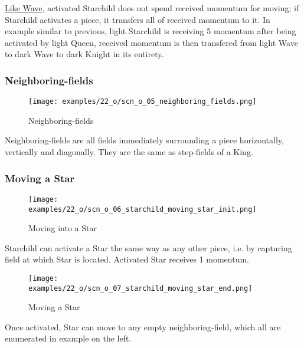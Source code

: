 \hyperref[fig:10_wave]{Like Wave}, activated Starchild does not spend received momentum for moving;
if Starchild activates a piece, it transfers all of received momentum to it. In example similar to
previous, light Starchild is receiving 5 momentum after being activated by light Queen, received
momentum is then transfered from light Wave to dark Wave to dark Knight in its entirety.

\clearpage %

\subsubsection*{Neighboring-fields}

\noindent
\begin{wrapfigure}[5]{l}{0.4\textwidth}
\centering
\texttt{[image: examples/22\_o/scn\_o\_05\_neighboring\_fields.png]}
\caption{Neighboring-fields}
\label{fig:scn_o_05_neighboring_fields}
\end{wrapfigure}
Neighboring-fields are all fields immediately surrounding a piece horizontally, vertically
and diagonally. They are the same as step-fields of a King.


\vspace*{2.1\baselineskip}
\subsubsection*{Moving a Star}

\noindent
\begin{wrapfigure}[5]{l}{0.4\textwidth}
\centering
\texttt{[image: examples/22\_o/scn\_o\_06\_starchild\_moving\_star\_init.png]}
\caption{Moving into a Star}
\label{fig:scn_o_06_starchild_moving_star_init}
\end{wrapfigure}
Starchild can activate a Star the same way as any other piece, i.e. by capturing field at
which Star is located. Activated Star receives 1 momentum.

\vspace*{2.1\baselineskip}
\noindent
\begin{wrapfigure}[7]{l}{0.4\textwidth}
\centering
\texttt{[image: examples/22\_o/scn\_o\_07\_starchild\_moving\_star\_end.png]}
\caption{Moving a Star}
\label{fig:scn_o_07_starchild_moving_star_end}
\end{wrapfigure}
Once activated, Star can move to any empty neighboring-field, which all are enumerated in
example on the left.

